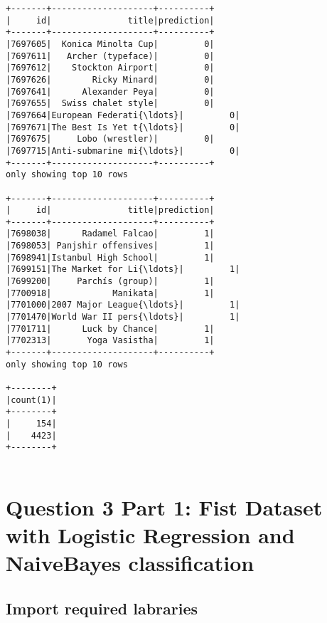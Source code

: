 \documentclass{report}
\begin{document}
    \begin{Verbatim}[commandchars=\\\{\}]
+-------+--------------------+----------+
|     id|               title|prediction|
+-------+--------------------+----------+
|7697605|  Konica Minolta Cup|         0|
|7697611|   Archer (typeface)|         0|
|7697612|    Stockton Airport|         0|
|7697626|        Ricky Minard|         0|
|7697641|      Alexander Peya|         0|
|7697655|  Swiss chalet style|         0|
|7697664|European Federati{\ldots}|         0|
|7697671|The Best Is Yet t{\ldots}|         0|
|7697675|     Lobo (wrestler)|         0|
|7697715|Anti-submarine mi{\ldots}|         0|
+-------+--------------------+----------+
only showing top 10 rows

+-------+--------------------+----------+
|     id|               title|prediction|
+-------+--------------------+----------+
|7698038|      Radamel Falcao|         1|
|7698053| Panjshir offensives|         1|
|7698941|Istanbul High School|         1|
|7699151|The Market for Li{\ldots}|         1|
|7699200|     Parchís (group)|         1|
|7700918|            Manikata|         1|
|7701000|2007 Major League{\ldots}|         1|
|7701470|World War II pers{\ldots}|         1|
|7701711|      Luck by Chance|         1|
|7702313|       Yoga Vasistha|         1|
+-------+--------------------+----------+
only showing top 10 rows

+--------+
|count(1)|
+--------+
|     154|
|    4423|
+--------+


    \end{Verbatim}

\chapter{Question 3 Part 1: Fist Dataset with Logistic Regression and
NaiveBayes
classification}\label{question-3-part-1-fist-dataset-with-logistic-regression-and-naivebayes-classification}

\section{Import required labraries}\label{import-required-labraries}
\end{document}
